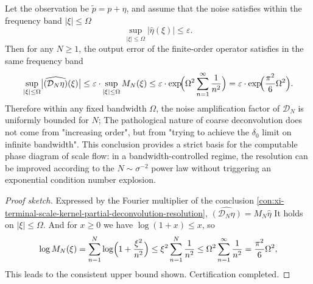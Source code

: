 \begin{conclusion}\label{con:xi-terminal-scale-kernel-bandwidth-conditioned}
Let the observation be \(\widetilde p=p+\eta\), and assume that the noise satisfies within the frequency band \(|\xi|\le\Omega\)
\[
\sup_{|\xi|\le\Omega}|\widehat\eta(\xi)|\le\varepsilon.
\]
Then for any \(N\ge 1\), the output error of the finite-order operator satisfies in the same frequency band
\[
\sup_{|\xi|\le\Omega}\bigl|\widehat{(\mathcal D_N\eta)}(\xi)\bigr|
\le
\varepsilon\cdot \sup_{|\xi|\le\Omega}M_N(\xi)
\le
\varepsilon\cdot \exp\!\Bigl(\Omega^2\sum_{n=1}^{\infty}\frac{1}{n^2}\Bigr)
=\varepsilon\cdot \exp\!\Bigl(\frac{\pi^2}{6}\Omega^2\Bigr).
\]
Therefore within any fixed bandwidth \(\Omega\), the noise amplification factor of \(\mathcal D_N\) is uniformly bounded for \(N\);
The pathological nature of coarse deconvolution does not come from "increasing order", but from "trying to achieve the \(\delta_0\) limit on infinite bandwidth".
This conclusion provides a strict basis for the computable phase diagram of scale flow: in a bandwidth-controlled regime, the resolution can be improved according to the \(N\sim\sigma^{-2}\) power law without triggering an exponential condition number explosion.
\end{conclusion}
\begin{proof}[Proof sketch]
Expressed by the Fourier multiplier of the conclusion \ref{con:xi-terminal-scale-kernel-partial-deconvolution-resolution},
\(
\widehat{(\mathcal D_N\eta)}=M_N\widehat\eta
\)
It holds on \(|\xi|\le\Omega\).
And for \(x\ge 0\) we have \(\log(1+x)\le x\), so
\[
\log M_N(\xi)=\sum_{n=1}^{N}\log\Bigl(1+\frac{\xi^2}{n^2}\Bigr)\le \xi^2\sum_{n=1}^{N}\frac{1}{n^2}
\le \Omega^2\sum_{n=1}^{\infty}\frac{1}{n^2}=\frac{\pi^2}{6}\Omega^2,
\]
This leads to the consistent upper bound shown. Certification completed.
\end{proof}

